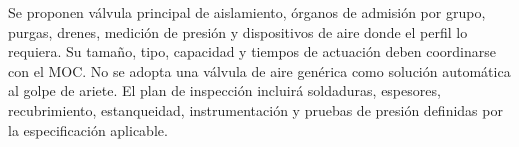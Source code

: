 Se proponen válvula principal de aislamiento, órganos de admisión por grupo, purgas, drenes, medición de presión y dispositivos de aire donde el perfil lo requiera. Su tamaño, tipo, capacidad y tiempos de actuación deben coordinarse con el MOC. No se adopta una válvula de aire genérica como solución automática al golpe de ariete. El plan de inspección incluirá soldaduras, espesores, recubrimiento, estanqueidad, instrumentación y pruebas de presión definidas por la especificación aplicable.
